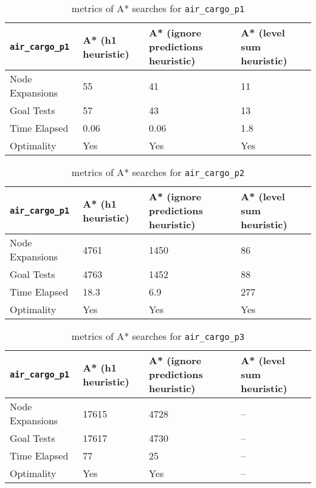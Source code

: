 \documentclass{article}
\begin{document}
\begin{table}[h]
\begin{center}
\begin{tabular}{|l|l|l|l|}
\hline
{\tt air\_cargo\_p1} & A* (h1 heuristic) & A* (ignore predictions heuristic) & A* (level sum heuristic)\\ \hline\hline
Node Expansions& 55  &  41 & 11 \\ 
Goal Tests & 57 & 43  & 13 \\ 
Time Elapsed& 0.06 & 0.06  & 1.8 \\ 
Optimality & Yes & Yes & Yes \\ \hline
\end{tabular}
\end{center}
\caption{metrics of A* searches for {\tt air\_cargo\_p1}}
\label{tbl:p2p1}
\end{table}

\begin{table}[h]
\begin{center}
\begin{tabular}{|l|l|l|l|}
\hline
{\tt air\_cargo\_p1} & A* (h1 heuristic) & A* (ignore predictions heuristic) & A* (level sum heuristic)\\ \hline\hline
Node Expansions& 4761  & 1450  & 86 \\ 
Goal Tests & 4763 & 1452  & 88 \\ 
Time Elapsed& 18.3 & 6.9  & 277 \\ 
Optimality & Yes & Yes & Yes \\ \hline
\end{tabular}
\end{center}
\caption{metrics of A* searches for {\tt air\_cargo\_p2}}
\label{tbl:p2p2}
\end{table}

\begin{table}[h]
\begin{center}
\begin{tabular}{|l|l|l|l|}
\hline
{\tt air\_cargo\_p1} & A* (h1 heuristic) & A* (ignore predictions heuristic) & A* (level sum heuristic)\\ \hline\hline
Node Expansions& 17615  &  4728 & -- \\ 
Goal Tests &17617  &  4730 & -- \\ 
Time Elapsed& 77 & 25  & -- \\ 
Optimality & Yes & Yes & -- \\ \hline
\end{tabular}
\end{center}
\caption{metrics of A* searches for {\tt air\_cargo\_p3}}
\label{tbl:p2p3}
\end{table}
\end{document}
